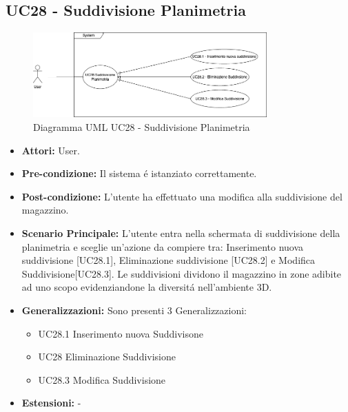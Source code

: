 \subsection{UC28 - Suddivisione Planimetria}
\begin{figure}[H]
  \centering
  \includegraphics[width=0.8\textwidth]{UC_diagrams_21-27/UC28.drawio.png}
  \caption{Diagramma UML UC28 - Suddivisione Planimetria}
\end{figure}
\begin{itemize}
    \item \textbf{Attori:} User.
    \item \textbf{Pre-condizione:}  Il sistema é istanziato correttamente.
    \item \textbf{Post-condizione:} L'utente ha effettuato una modifica alla suddivisione del magazzino.
    \item \textbf{Scenario Principale:} L'utente entra nella schermata di suddivisione della planimetria e sceglie un'azione da compiere tra: Inserimento nuova suddivisione [UC28.1], Eliminazione suddivisione [UC28.2] e Modifica Suddivisione[UC28.3]. Le suddivisioni dividono il magazzino in zone adibite ad uno scopo evidenziandone la diversitá nell'ambiente 3D.
    \item \textbf{Generalizzazioni:} Sono presenti 3 Generalizzazioni:
        \begin{itemize}
        \item UC28.1 Inserimento nuova Suddivisone
        \item UC28 Eliminazione Suddivisione
        \item UC28.3 Modifica Suddivisione
    \end{itemize}
    \item \textbf{Estensioni:} -
\end{itemize}

